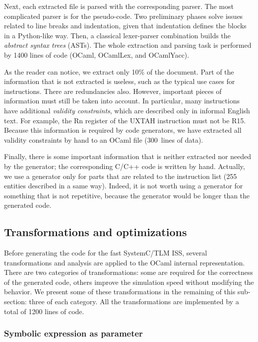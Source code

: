 \documentclass[conference]{ieeeconf}
\begin{document}
Next, each extracted file is parsed with the corresponding parser. The most
complicated parser is for the pseudo-code. Two preliminary phases solve
issues related to line breaks and indentation, given that indentation
defines the blocks in a Python-like way. Then, a classical lexer-parser
combination builds the {\em abstract syntax trees} (ASTs).  The whole extraction
and parsing task is performed by 1400 lines of code (OCaml, OCamlLex, and OCamlYacc).

As the reader can notice, we extract only 10\% of the document. Part of the
information that is not extracted is useless, such as the typical use cases
for instructions. There are redundancies also. However,
important pieces of information must still be taken into account.
In particular, many instructions have additional {\em
  validity constraints}, which are described only in informal English text. For
example, the {\stt Rn} register of the {\stt UXTAH} instruction must not be {\stt
  R15}. Because this information is required by code generators, we have
extracted all validity constraints by hand to an OCaml file (300~lines of data).

Finally, there is some important information that is neither extracted nor
needed by the generator; the corresponding C/C++ code is written by
hand. Actually, we use a generator only for parts that are related to the
instruction list (255 entities described in a same way). Indeed, it is not worth
using a generator for something that is not repetitive, because the generator
would be longer than the generated code.


\subsection{Transformations and optimizations}

Before generating the code for the fast SystemC/TLM ISS, several transformations
and analysis are applied to the OCaml internal representation. There are two
categories of transformations: some are required for the correctness of the
generated code, others improve the simulation speed without modifying the behavior.
We present some of these transformations in the remaining of this sub-section:
three of each category. All the transformations are implemented by a total of
1200 lines of code.

\subsubsection{Symbolic expression as parameter}
\end{document}
